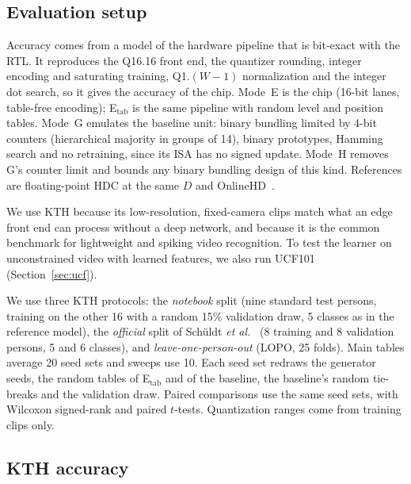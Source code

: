 \documentclass[conference]{IEEEtran}
\begin{document}
\subsection{Evaluation setup}
Accuracy comes from a model of the hardware pipeline that is bit-exact with the RTL. It reproduces the Q16.16 front end, the quantizer rounding, integer encoding and saturating training, Q1.$(W{-}1)$ normalization and the integer dot search, so it gives the accuracy of the chip. Mode~E is the chip (16-bit lanes, table-free encoding); E$_{\mathrm{tab}}$ is the same pipeline with random level and position tables. Mode~G emulates the baseline unit: binary bundling limited by 4-bit counters (hierarchical majority in groups of 14), binary prototypes, Hamming search and no retraining, since its ISA has no signed update. Mode~H removes G's counter limit and bounds any binary bundling design of this kind. References are floating-point HDC at the same $D$ and OnlineHD~\cite{onlinehd}.

We use KTH because its low-resolution, fixed-camera clips match what an edge front end can process without a deep network, and because it is the common benchmark for lightweight and spiking video recognition. To test the learner on unconstrained video with learned features, we also run UCF101 (Section~\ref{sec:ucf}).

We use three KTH protocols: the \emph{notebook} split (nine standard test persons, training on the other 16 with a random 15\% validation draw, 5 classes as in the reference model), the \emph{official} split of Sch\"uldt \emph{et al.}~\cite{schuldt2004} (8 training and 8 validation persons, 5 and 6 classes), and \emph{leave-one-person-out} (LOPO, 25 folds).
Main tables average 20 seed sets and sweeps use 10. Each seed set redraws the generator seeds, the random tables of E$_{\mathrm{tab}}$ and of the baseline, the baseline's random tie-breaks and the validation draw. Paired comparisons use the same seed sets, with Wilcoxon signed-rank and paired $t$-tests. Quantization ranges come from training clips only.

\subsection{KTH accuracy}
\label{sec:acc}
\end{document}
